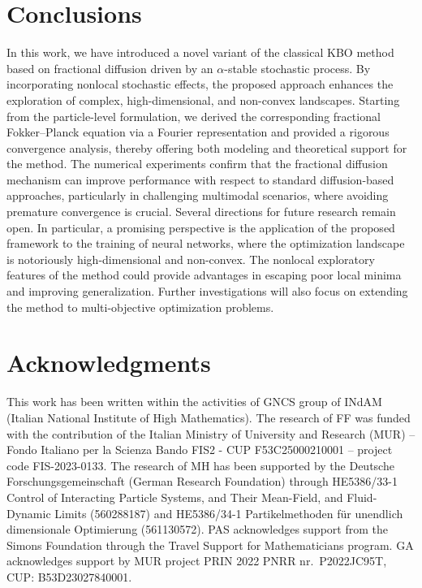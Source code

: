 \documentclass[11pt,handout]{article}%
\numberwithin{equation}{section}
\theoremstyle{definition}
\begin{document}
\section{Conclusions}
\label{sec:conclusions}

In this work, we have introduced a novel variant of the classical KBO method based on fractional diffusion driven by an $\alpha$-stable stochastic process. By incorporating nonlocal stochastic effects, the proposed approach enhances the exploration of complex, high-dimensional, and non-convex landscapes. Starting from the particle-level formulation, we derived the corresponding fractional Fokker–Planck equation via a Fourier representation and provided a rigorous convergence analysis, thereby offering both modeling and theoretical support for the method.
The numerical experiments confirm that the fractional diffusion mechanism can improve performance with respect to standard diffusion-based approaches, particularly in challenging multimodal scenarios, where avoiding premature convergence is crucial.
Several directions for future research remain open. In particular, a promising perspective is the application of the proposed framework to the training of neural networks, where the optimization landscape is notoriously high-dimensional and non-convex. The nonlocal exploratory features of the method could provide advantages in escaping poor local minima and improving generalization. Further investigations will also focus on extending the method to multi-objective optimization problems.


\section*{Acknowledgments}
This work has been written within the activities of GNCS group of INdAM (Italian National Institute of High Mathematics). The research of FF was funded with the contribution of the Italian Ministry of University and Research (MUR) – Fondo Italiano per la Scienza Bando FIS2 - CUP F53C25000210001 – project code FIS-2023-0133. The research of MH has been supported by the Deutsche Forschungsgemeinschaft (German Research Foundation) through HE5386/33-1 Control of Interacting Particle Systems, and Their Mean-Field, and Fluid-Dynamic Limits (560288187) and 
HE5386/34-1 Partikelmethoden für unendlich dimensionale Optimierung (561130572). PAS acknowledges support from the Simons Foundation through the Travel Support for Mathematicians program.  GA acknowledges support by MUR project PRIN 2022 PNRR nr.~P2022JC95T, CUP: B53D23027840001.



\end{document}
